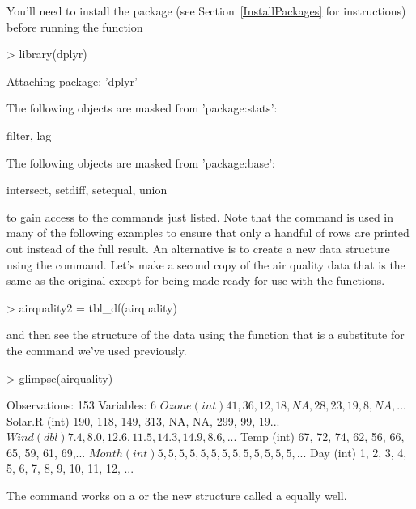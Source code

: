 You'll need to install the package (see Section~\ref{InstallPackages} for instructions) before running the function 
\begin{Schunk}
\begin{Sinput}
> library(dplyr) 
\end{Sinput}
\begin{Soutput}

Attaching package: 'dplyr'
\end{Soutput}
\begin{Soutput}
The following objects are masked from 'package:stats':

    filter, lag
\end{Soutput}
\begin{Soutput}
The following objects are masked from 'package:base':

    intersect, setdiff, setequal, union
\end{Soutput}
\end{Schunk}
to gain access to the commands just listed. Note that the  command is used in many of the following examples to ensure that only a handful of rows are printed out instead of the full result. An alternative is to create a new data structure using the  command. Let's make a second copy of the air quality data that is the same as the original except for being made ready for use with the  functions. 
\begin{Schunk}
\begin{Sinput}
> airquality2 = tbl_df(airquality) 
\end{Sinput}
\end{Schunk}
and then see the structure of the data using the  function that is a substitute for the  command we've used previously. 
\begin{Schunk}
\begin{Sinput}
> glimpse(airquality) 
\end{Sinput}
\begin{Soutput}
Observations: 153
Variables: 6
$ Ozone   (int) 41, 36, 12, 18, NA, 28, 23, 19, 8, NA, ...
$ Solar.R (int) 190, 118, 149, 313, NA, NA, 299, 99, 19...
$ Wind    (dbl) 7.4, 8.0, 12.6, 11.5, 14.3, 14.9, 8.6, ...
$ Temp    (int) 67, 72, 74, 62, 56, 66, 65, 59, 61, 69,...
$ Month   (int) 5, 5, 5, 5, 5, 5, 5, 5, 5, 5, 5, 5, 5, ...
$ Day     (int) 1, 2, 3, 4, 5, 6, 7, 8, 9, 10, 11, 12, ...
\end{Soutput}
\end{Schunk}
The  command works on a  or the new structure called a  equally well. 
  
